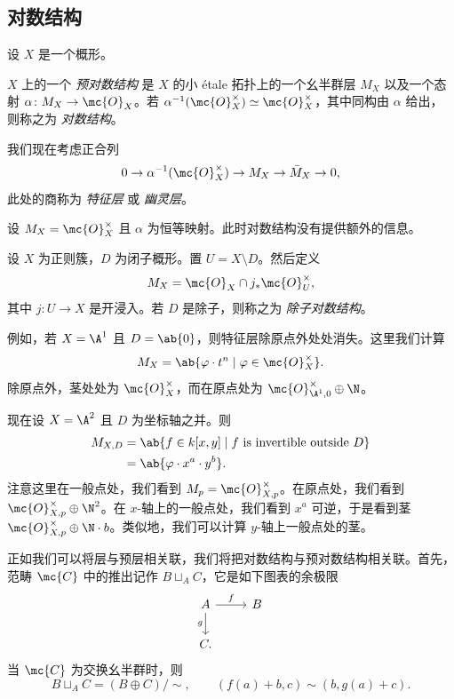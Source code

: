 \subsection{对数结构}%
\label{sub:Log structures}

设 \(X\) 是一个概形。
\begin{defn}
    \(X\) 上的一个 \textit{预对数结构} 是 \(X\) 的小 \'etale 拓扑上的一个幺半群层 \(M_X\) 以及一个态射 \(\alpha \colon M_X \to \mc{O}_X\)。若 \(\alpha^{-1}(\mc{O}_X^{\times}) \simeq \mc{O}_X^{\times}\)，其中同构由 \(\alpha\) 给出，则称之为 \textit{对数结构}。
\end{defn}

我们现在考虑正合列
\[ 0 \to \alpha^{-1}(\mc{O}_X^{\times}) \to M_X \to \bar{M}_X \to 0, \]
此处的商称为 \textit{特征层} 或 \textit{幽灵层}。

\begin{exm}
    设 \(M_X = \mc{O}_X^{\times}\) 且 \(\alpha\) 为恒等映射。此时对数结构没有提供额外的信息。
\end{exm}

\begin{exm}
    设 \(X\) 为正则簇，\(D\) 为闭子概形。置 \(U = X \setminus D\)。然后定义
    \[ M_X = \mc{O}_X \cap j_* \mc{O}_U^{\times}, \]
    其中 \(j \colon U \to X\) 是开浸入。若 \(D\) 是除子，则称之为 \textit{除子对数结构}。

    例如，若 \(X = \A^1\) 且 \(D = \ab\{0\}\)，则特征层除原点外处处消失。这里我们计算
    \[ M_X = \ab\{ \varphi \cdot t^n \mid \varphi \in \mc{O}_X^{\times} \}. \]
    除原点外，茎处处为 \(\mc{O}_X^{\times}\)，而在原点处为 \(\mc{O}_{\A^1, 0}^{\times} \oplus \N\)。
\end{exm}

\begin{exm}
    现在设 \(X = \A^2\) 且 \(D\) 为坐标轴之并。则
    \begin{align*}
        M_{X,D} &= \ab\{f \in k[x,y] \mid f \text{ is invertible outside } D \} \\
        &= \ab\{\varphi \cdot x^a \cdot y^b\}.
    \end{align*}
    注意这里在一般点处，我们看到 \(M_p = \mc{O}_{X,p}^{\times}\)。在原点处，我们看到 \(\mc{O}_{X,p}^{\times}\oplus \N^2\)。在 \(x\)-轴上的一般点处，我们看到 \(x^a\) 可逆，于是看到茎 \(\mc{O}_{X,p}^{\times}\oplus \N \cdot b\)。类似地，我们可以计算 \(y\)-轴上一般点处的茎。
\end{exm}

正如我们可以将层与预层相关联，我们将把对数结构与预对数结构相关联。首先，范畴 \(\mc{C}\) 中的推出记作 \(B \sqcup_A C\)，它是如下图表的余极限
\begin{equation*}
\begin{tikzcd}
    A \ar{r}{f} \ar{d}[swap]{g} & B \\
    C.
\end{tikzcd}
\end{equation*}
当 \(\mc{C}\) 为交换幺半群时，则
\[ B \sqcup_A C = (B \oplus C)/\sim, \qquad (f(a) + b, c) \sim (b, g(a)+c). \]

